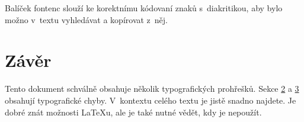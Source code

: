 \documentclass[a4paper, 10pt, twocolumn]{article}
\begin{document}
Balíček fontenc slouží ke korektnímu kódovaní znaků s~diakritikou, aby bylo možno v~textu vyhledávat a kopírovat z~něj.


\section{Závěr}

Tento dokument schválně obsahuje několik typografických prohřešků.
Sekce \hyperref[sec2]{2} a \hyperref[sec3]{3} obsahují typografické chyby.
V~kontextu celého textu je jistě snadno najdete.
Je dobré znát možnosti \LaTeX u, ale je také nutné vědět, kdy je nepoužít.
\end{document}
